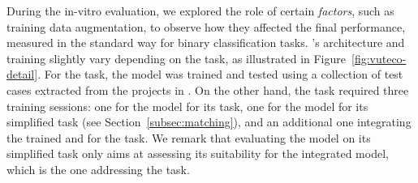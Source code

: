 

During the in-vitro evaluation, we explored the role of certain \textit{factors}, such as training data augmentation, to observe how they affected the final performance, measured in the standard way for binary classification tasks.
%
\vuteco's architecture and training slightly vary depending on the task, as illustrated in Figure~\ref{fig:vuteco-detail}.
For the \finding task, the \finder model was trained and tested using a collection of test cases extracted from the projects in \VulforJ.
%
On the other hand, the \matching task required three training sessions: one for the \finder model for its \finding task, one for the \linker model for its simplified task (see Section~\ref{subsec:matching}), and an additional one integrating the trained \finder and \linker for the \matching task.
We remark that evaluating the \linker model on its simplified task only aims at assessing its suitability for the integrated model, which is the one addressing the \matching task.

%

